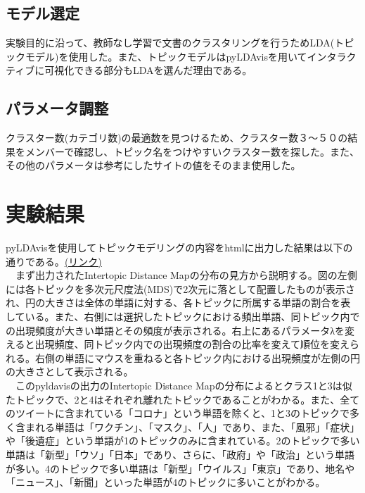 \documentclass[a4paper, 11pt, titlepage]{jsarticle}
\begin{document}
\subsection{モデル選定}
実験目的に沿って、教師なし学習で文書のクラスタリングを行うためLDA(トピックモデル)を使用した。また、トピックモデルはpyLDAvisを用いてインタラクティブに可視化できる部分もLDAを選んだ理由である。 

\subsection{パラメータ調整}
クラスター数(カテゴリ数)の最適数を見つけるため、クラスター数３〜５０の結果をメンバーで確認し、トピック名をつけやすいクラスター数を探した。また、その他のパラメータは参考にしたサイトの値をそのまま使用した\cite{LDA}。

\section{実験結果}
pyLDAvisを使用してトピックモデリングの内容をhtmlに出力した結果は以下の通りである。\href{https://ie.u-ryukyu.ac.jp/~e205759/pyldavis_output.html}{(リンク)}\\
　まず出力されたIntertopic Distance Mapの分布の見方から説明する。図の左側には各トピックを多次元尺度法(MDS)で2次元に落として配置したものが表示され、円の大きさは全体の単語に対する、各トピックに所属する単語の割合を表している。また、右側には選択したトピックにおける頻出単語、同トピック内での出現頻度が大きい単語とその頻度が表示される。右上にあるパラメータλを変えると出現頻度、同トピック内での出現頻度の割合の比率を変えて順位を変えられる。右側の単語にマウスを重ねると各トピック内における出現頻度が左側の円の大きさとして表示される。\\
　このpyldavisの出力のIntertopic Distance Mapの分布によるとクラス1と3は似たトピックで、2と4はそれぞれ離れたトピックであることがわかる。また、全てのツイートに含まれている「コロナ」という単語を除くと、1と3のトピックで多く含まれる単語は「ワクチン」、「マスク」、「人」であり、また、「風邪」「症状」や「後遺症」という単語が1のトピックのみに含まれている。2のトピックで多い単語は「新型」「ウソ」「日本」であり、さらに、「政府」や「政治」という単語が多い。4のトピックで多い単語は「新型」「ウイルス」「東京」であり、地名や「ニュース」、「新聞」といった単語が4のトピックに多いことがわかる。
\end{document}
